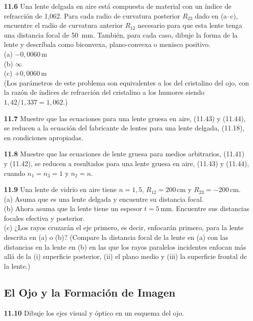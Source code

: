 \documentclass[12pt]{book}
\begin{document}
\textbf{11.6} Una lente delgada en aire está compuesta de material con un índice de refracción de 1,062. Para cada radio de curvatura posterior $R_{23}$ dado en (a--c), encuentre el radio de curvatura anterior $R_{12}$ necesario para que esta lente tenga una distancia focal de 50~mm. También, para cada caso, dibuje la forma de la lente y descríbala como biconvexa, plano-convexa o menisco positivo.\\
(a) $-0{,}0060\,\text{m}$\\
(b) $\infty$\\
(c) $+0{,}0060\,\text{m}$\\
(Los parámetros de este problema son equivalentes a los del cristalino del ojo, con la razón de índices de refracción del cristalino a los humores siendo $1{,}42/1{,}337 = 1{,}062$.)

\textbf{11.7} Muestre que las ecuaciones para una lente gruesa en aire, (11.43) y (11.44), se reducen a la ecuación del fabricante de lentes para una lente delgada, (11.18), en condiciones apropiadas.

\textbf{11.8} Muestre que las ecuaciones de lente gruesa para medios arbitrarios, (11.41) y (11.42), se reducen a resultados para una lente gruesa en aire, (11.43) y (11.44), cuando $n_1 = n_3 = 1$ y $n_2 = n$.

\textbf{11.9} Una lente de vidrio en aire tiene $n = 1{,}5$, $R_{12} = 200\,\text{cm}$ y $R_{23} = -200\,\text{cm}$.\\
(a) Asuma que es una lente delgada y encuentre su distancia focal.\\
(b) Ahora asuma que la lente tiene un espesor $t = 5\,\text{mm}$. Encuentre sus distancias focales efectiva y posterior.\\
(c) ¿Los rayos cruzarán el eje primero, es decir, enfocarán primero, para la lente descrita en (a) o (b)? (Compare la distancia focal de la lente en (a) con las distancias en la lente en (b) en las que los rayos paralelos incidentes enfocan más allá de la (i) superficie posterior, (ii) el plano medio y (iii) la superficie frontal de la lente.)

\subsection*{El Ojo y la Formación de Imagen}

\textbf{11.10} Dibuje los ejes visual y óptico en un esquema del ojo.
\end{document}
